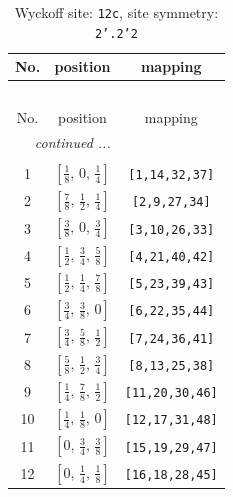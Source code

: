\documentclass[fleqn,8pt]{jsarticle}
\begin{document}
\begin{longtable}{ccc}
\caption{Wyckoff site: {\tt 12c}, site symmetry: {\tt 2'.2'2}}
 \\
 \hline \hline
No. & position & mapping \\ \hline \endfirsthead

\multicolumn{2}{l}{\tablename\ \thetable{}} \\
 \hline \hline
No. & position & mapping \\ \hline \endhead

 \hline \hline
\multicolumn{2}{r}{\footnotesize\it continued ...} \\ \endfoot

 \hline \hline
\multicolumn{2}{r}{} \\ \endlastfoot

1 & $\left[ \frac{1}{8},\, 0,\, \frac{1}{4} \right]$ & {\tt [1,14,32,37]} \\ \hline
2 & $\left[ \frac{7}{8},\, \frac{1}{2},\, \frac{1}{4} \right]$ & {\tt [2,9,27,34]} \\ \hline
3 & $\left[ \frac{3}{8},\, 0,\, \frac{3}{4} \right]$ & {\tt [3,10,26,33]} \\ \hline
4 & $\left[ \frac{1}{2},\, \frac{3}{4},\, \frac{5}{8} \right]$ & {\tt [4,21,40,42]} \\ \hline
5 & $\left[ \frac{1}{2},\, \frac{1}{4},\, \frac{7}{8} \right]$ & {\tt [5,23,39,43]} \\ \hline
6 & $\left[ \frac{3}{4},\, \frac{3}{8},\, 0 \right]$ & {\tt [6,22,35,44]} \\ \hline
7 & $\left[ \frac{3}{4},\, \frac{5}{8},\, \frac{1}{2} \right]$ & {\tt [7,24,36,41]} \\ \hline
8 & $\left[ \frac{5}{8},\, \frac{1}{2},\, \frac{3}{4} \right]$ & {\tt [8,13,25,38]} \\ \hline
9 & $\left[ \frac{1}{4},\, \frac{7}{8},\, \frac{1}{2} \right]$ & {\tt [11,20,30,46]} \\ \hline
10 & $\left[ \frac{1}{4},\, \frac{1}{8},\, 0 \right]$ & {\tt [12,17,31,48]} \\ \hline
11 & $\left[ 0,\, \frac{3}{4},\, \frac{3}{8} \right]$ & {\tt [15,19,29,47]} \\ \hline
12 & $\left[ 0,\, \frac{1}{4},\, \frac{1}{8} \right]$ & {\tt [16,18,28,45]} \\
\end{longtable}
\renewcommand{\arraystretch}{1.2}
\end{document}
